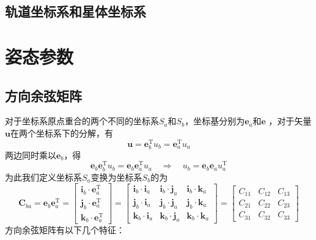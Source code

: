 \subsection{轨道坐标系和星体坐标系}
\vspace*{-1em}



\section{姿态参数}
\subsection{方向余弦矩阵}
	对于坐标系原点重合的两个不同的坐标系$S_a$和$S_b$，坐标基分别为$\bm{e}_a$和$\bm{e}$
，对于矢量$\bm{u}$在两个坐标系下的分解，有
\begin{equation}
	\bm{u} = \bm{e}_b^{\text{T}}u_b = \bm{e}_a^{\text{T}}u_a
\end{equation}
两边同时乘以$\bm{e}_b$，得
\begin{equation*}
	\bm{e}_b \bm{e}_b^{\text{T}} u_b = \bm{e}_b \bm{e}_a^{\text{T}} u_a \quad \Rightarrow \quad u_b = \bm{e}_b\bm{e}_au_a^{\text{T}}
\end{equation*}
为此我们定义坐标系$S_a$变换为坐标系$S_b$的为
\begin{equation}
	\bm{C}_{ba} = \bm{e}_b \bm{e}_a^{\text{T}}
	=
	\begin{bmatrix}
		\bm{i}_b \cdot \bm{e}_a^{\text{T}} \\
		\bm{j}_b \cdot \bm{e}_a^{\text{T}} \\
		\bm{k}_b \cdot \bm{e}_a^{\text{T}} 
	\end{bmatrix}
	=
	\begin{bmatrix}
		\bm{i}_b \cdot \bm{i}_a & \bm{i}_b \cdot \bm{j}_a & \bm{i}_b \cdot \bm{k}_a \\
		\bm{j}_b \cdot  \bm{i}_a & \bm{j}_b \cdot \bm{j}_a & \bm{j}_b \cdot \bm{k}_a \\
		\bm{k}_b \cdot  \bm{i}_a & \bm{k}_b \cdot \bm{j}_a & \bm{k}_b \cdot \bm{k}_a 
	\end{bmatrix}
	=
	\begin{bmatrix}
		C_{11} & C_{12} & C_{13} \\
		C_{21} & C_{22} & C_{23} \\
		C_{31} & C_{32} & C_{33}
	\end{bmatrix}
\end{equation}
方向余弦矩阵有以下几个特征：

